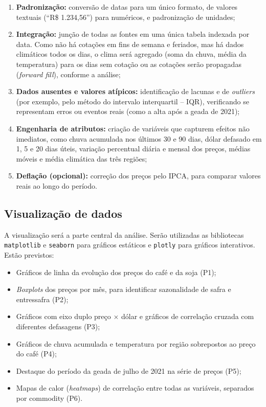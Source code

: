 \documentclass{article}
\begin{document}
\begin{enumerate}
      \item \textbf{Padronização:} conversão de datas para um único formato, de valores textuais
            (``R\$ 1.234,56'') para numéricos, e padronização de unidades;
      \item \textbf{Integração:} junção de todas as fontes em uma única tabela indexada por data. Como não há
            cotações em fins de semana e feriados, mas há dados climáticos todos os dias, o clima será
            agregado (soma da chuva, média da temperatura) para os dias sem cotação ou as cotações serão
            propagadas (\textit{forward fill}), conforme a análise;
      \item \textbf{Dados ausentes e valores atípicos:} identificação de lacunas e de \textit{outliers}
            (por exemplo, pelo método do intervalo interquartil -- IQR), verificando se representam erros
            ou eventos reais (como a alta após a geada de 2021);
      \item \textbf{Engenharia de atributos:} criação de variáveis que capturem efeitos não imediatos, como
            chuva acumulada nos últimos 30 e 90 dias, dólar defasado em 1, 5 e 20 dias úteis, variação
            percentual diária e mensal dos preços, médias móveis e média climática das três regiões;
      \item \textbf{Deflação (opcional):} correção dos preços pelo IPCA, para comparar valores reais ao
            longo do período.
\end{enumerate}

\subsection{Visualização de dados}

A visualização será a parte central da análise. Serão utilizadas as bibliotecas \texttt{matplotlib} e
\texttt{seaborn} para gráficos estáticos e \texttt{plotly} para gráficos interativos. Estão previstos:

\begin{itemize}
      \item Gráficos de linha da evolução dos preços do café e da soja (P1);
      \item \textit{Boxplots} dos preços por mês, para identificar sazonalidade de safra e entressafra (P2);
      \item Gráficos com eixo duplo preço $\times$ dólar e gráficos de correlação cruzada com diferentes
            defasagens (P3);
      \item Gráficos de chuva acumulada e temperatura por região sobrepostos ao preço do café (P4);
      \item Destaque do período da geada de julho de 2021 na série de preços (P5);
      \item Mapas de calor (\textit{heatmaps}) de correlação entre todas as variáveis, separados por
            commodity (P6).
\end{itemize}
\end{document}
